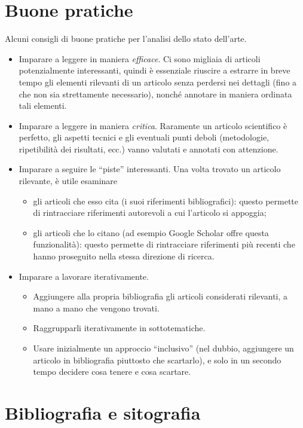 \documentclass[12pt,italian]{report}
\begin{document}
\section{Buone pratiche}

Alcuni consigli di buone pratiche per l'analisi dello stato dell'arte.
\begin{itemize}
\item Imparare a leggere in maniera {\em efficace}. Ci sono migliaia di articoli potenzialmente interessanti, quindi \`e essenziale riuscire a estrarre in breve tempo gli elementi rilevanti di un articolo senza perdersi nei dettagli (fino a che non sia strettamente necessario), nonch\'e annotare in maniera ordinata tali elementi.
\item Imparare a leggere in maniera {\em critica}. Raramente un articolo scientifico \`e perfetto, gli aspetti tecnici e gli eventuali punti deboli (metodologie, ripetibilit\`a dei risultati, ecc.) vanno valutati e annotati con attenzione.
\item Imparare a seguire le ``piste'' interessanti. Una volta trovato un articolo rilevante, \`e utile esaminare
\begin{itemize}
\item gli articoli che esso cita (i suoi riferimenti bibliografici): questo permette di rintracciare riferimenti autorevoli a cui l'articolo si appoggia;
\item gli articoli che lo citano (ad esempio Google Scholar offre questa funzionalit\`a): questo permette di rintracciare riferimenti pi\`u recenti che hanno proseguito nella stessa direzione di ricerca.
\end{itemize}
\item Imparare a lavorare iterativamente.
\begin{itemize}
\item Aggiungere alla propria bibliografia gli articoli considerati rilevanti, a mano a mano che vengono trovati.
\item Raggrupparli iterativamente in sottotematiche.
\item Usare inizialmente un approccio ``inclusivo'' (nel dubbio, aggiungere un articolo in bibliografia piuttosto che scartarlo), e solo in un secondo tempo decidere cosa tenere e cosa scartare.
\end{itemize}
\end{itemize}



\section{Bibliografia e sitografia}
\label{sec:biblio}
\end{document}
